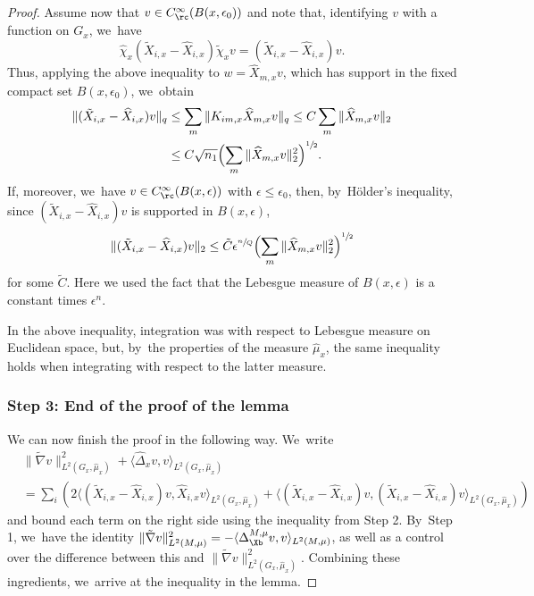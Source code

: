 \begin{proof}
Assume now that $v\in C^\infty_\rc(B(x,\epsilon_0))$ and note that, identifying $v$ with a function on $G_x$, we~have
\[
\widehat \chi_x (\tilde X_{i,x} -\widehat X_{i,x}) \tilde\chi_x v
= (\tilde X_{i,x} -\widehat X_{i,x}) v.
\]
Thus, applying the above inequality to $w= \widehat X_{m,x} v$, which has support in the fixed compact set $B(x,\epsilon_0)$, we~obtain
\begin{align*}
\| (\tilde X_{i,x} -\widehat X_{i,x})v \|_q & \leq \sum_m \| K_{im,x} \widehat X_{m,x} v \|_q \leq C \sum_m \| \widehat X_{m,x} v \|_2 \\
& \leq C \sqrt{n_1} \Bigl(\sum_m \| \widehat X_{m,x} v \|_2^2 \Bigr)^{\sfrac12}.
\end{align*}
If, moreover, we~have $v\in C^\infty_\rc(B(x,\epsilon))$ with $\epsilon\leq\epsilon_0$, then, by~Hölder's inequality, since $(\tilde X_{i,x} -\widehat X_{i,x})v$ is supported in $B(x,\epsilon)$,
\[
\| (\tilde X_{i,x} -\widehat X_{i,x})v \|_2 \leq \tilde C \epsilon^{\sfrac n Q} \Bigl(\sum_m \| \widehat X_{m,x} v \|_2^2 \Bigr)^{\sfrac12}
\]
for some $\tilde C$. Here we used the fact that the Lebesgue measure of $B(x,\epsilon)$ is a constant times $\epsilon^n$.

In the above inequality, integration was with respect to Lebesgue measure on Euclidean space, but, by~the properties of the measure $\widehat\mu_x$, the same inequality holds when integrating with respect to the latter measure.

\subsubsection*{Step 3: End of the proof of the lemma}
We can now finish the proof in the following way. We~write
\begin{align*}
& \| \tilde \nabla v \|^2_{L^2(G_x,\widehat\mu_{x})} +
\langle \widehat \Delta_{x} v, v \rangle_{L^2(G_x,\widehat\mu_{x})} \\
& = \sum_i \! \left(2 \langle (\tilde X_{i,x}-\widehat X_{i,x}) v, \widehat X_{i,x} v \rangle_{L^2(G_x,\widehat\mu_{x})} \! + \! \langle (\tilde X_{i,x}-\widehat X_{i,x}) v, (\tilde X_{i,x}-\widehat X_{i,x}) v\rangle_{L^2(G_x,\widehat\mu_{x})}\right)
\end{align*}
and bound each term on the right side using the inequality from Step 2. By~Step 1, we~have the identity $\| \tilde \nabla v \|^2_{L^2(M,\mu)} = -\langle\Delta_\Xb^{M,\mu} v,v\rangle_{L^2(M,\mu)}$, as well as a control over the difference between this and $\| \tilde \nabla v \|^2_{L^2(G_x,\widehat\mu_{x})}$. Combining these ingredients, we~arrive at the inequality in the lemma.
\end{proof}

